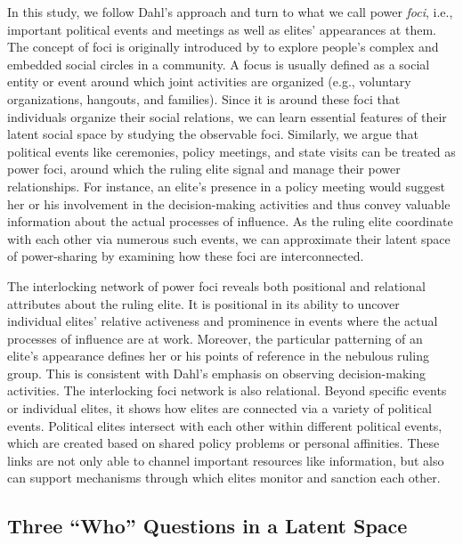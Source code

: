 \documentclass[11pt,english]{article}
\begin{document}
\begin{flushleft}
In this study, we follow Dahl's approach and turn to what we call power \emph{foci}, i.e., important political events and meetings as well as elites' appearances at them. The concept of foci is originally introduced by \citet{Feld1981} to explore people's complex and embedded social circles in a community. A focus is usually defined as a social entity or event around which joint activities are organized (e.g., voluntary organizations, hangouts, and families). Since it is around these foci that individuals organize their social relations, we can learn essential features of their latent social space by studying the observable foci. Similarly, we argue that political events like ceremonies, policy meetings, and state visits can be treated as power foci, around which the ruling elite signal and manage their power relationships. For instance, an elite's presence in a policy meeting would suggest her or his involvement in the decision-making activities and thus convey valuable information about the actual processes of influence. As the ruling elite coordinate with each other via numerous such events, we can approximate their latent space of power-sharing by examining how these foci are interconnected.

The interlocking network of power foci reveals both positional and relational attributes about the ruling elite. It is positional in its ability to uncover individual elites' relative activeness and prominence in events where the actual processes of influence are at work. Moreover, the particular patterning of an elite's appearance defines her or his points of reference in the nebulous ruling group. This is consistent with Dahl's \citeyearpar{Dahl1961} emphasis on observing decision-making activities. The interlocking foci network is also relational. Beyond specific events or individual elites, it shows how elites are connected via a variety of political events. Political elites intersect with each other within different political events, which are created based on shared policy problems or personal affinities. These links are not only able to channel important resources like information, but also can support mechanisms through which elites monitor and sanction each other.

\subsection*{Three ``Who'' Questions in a Latent Space}


\end{flushleft}
\end{document}
